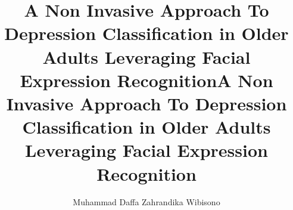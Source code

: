 \documentclass[english,nohyphen]{GayaUKM}
\title{A Non Invasive Approach To Depression Classification in Older Adults Leveraging Facial Expression Recognition}
\author{Muhammad Daffa Zahrandika Wibisono}  %
\begin{document}
\makecoverpage

\title{A Non Invasive Approach To Depression Classification in Older Adults Leveraging Facial Expression Recognition}
\maketitlepage


\frontmatter
\declaration








\tableofcontents
\listoffigures
\listoftables




\mainmatter








\appendix


\end{document}
